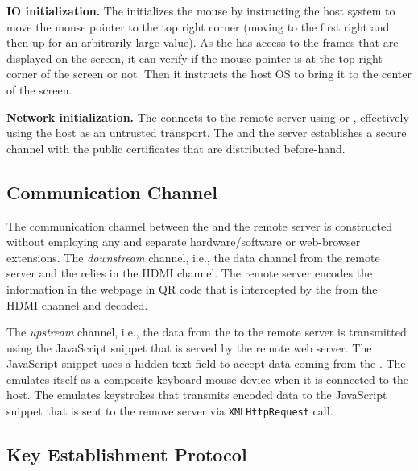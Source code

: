\begin{mylist}
  \item\textbf{IO initialization.} The \device initializes the mouse by instructing the host system to move the mouse pointer to the top right corner (moving to the first right and then up for an arbitrarily large value). As the \device has access to the frames that are displayed on the screen, it can verify if the mouse pointer is at the top-right corner of the screen or not. Then it instructs the host OS to bring it to the center of the screen.
  
  \item\textbf{Network initialization.} The \device connects to the remote server using \webusb or \webbt, effectively using the host as an untrusted transport. The \device and the server establishes a secure channel with the public certificates that are distributed before-hand.
\end{mylist}


\subsection{Communication Channel}
\label{sec:systemDesign:communicationChannel}

The communication channel between the \device and the remote server is constructed without employing any and separate hardware/software or web-browser extensions. The \emph{downstream} channel, i.e., the data channel from the remote server and the \device relies in the HDMI channel. The remote server encodes the information in the webpage in QR code that is intercepted by the \device from the HDMI channel and decoded.

The \emph{upstream} channel, i.e., the data from the \device to the remote server is transmitted using the \name JavaScript snippet that is served by the remote web server. The \name JavaScript snippet uses a hidden text field to accept data coming from the \device. The \device emulates itself as a composite keyboard-mouse device when it is connected to the host. The \device emulates keystrokes that transmits encoded data to the \name JavaScript snippet that is sent to the remove server via \texttt{XMLHttpRequest} call.


\subsection{Key Establishment Protocol}
\label{sec:systemDesign:keyEstablishment}


